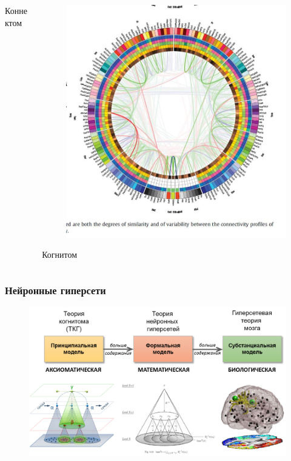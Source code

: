 \documentclass[default]{beamer}
\begin{document}
\begin{frame}
\begin{columns}
\begin{column}{0.3\textwidth}
\begin{figure}
				\end{figure}
				\centering
				Коннектом
			\end{column}
			\begin{column}{0.3\textwidth}		
				\begin{figure}
					\includegraphics[width=\textwidth]{cognitome}
				\end{figure}
				\centering
				Когнитом
			\end{column}
		\end{columns}		
	\end{frame}
	
	\begin{frame}
		\frametitle{Нейронные гиперсети}
		
		\begin{figure}
			\includegraphics[width=\textwidth]{etaps}
		\end{figure}
	\end{frame}	
															
\end{document}
